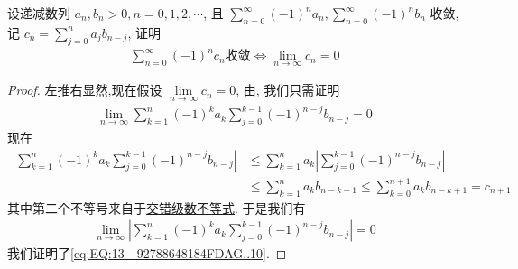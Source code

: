 \documentclass[../../main.tex]{subfiles}%
\begin{document}
\begin{example}
设递减数列 $a_n, b_n > 0, n = 0, 1, 2, \cdots$, 且 $\sum\limits_{n=0}^{\infty} (-1)^n a_n, \sum\limits_{n=0}^{\infty} (-1)^n b_n$ 收敛, 记 $c_n = \sum\limits_{j=0}^{n} a_j b_{n-j}$, 证明
\begin{align}
\sum\limits_{n=0}^{\infty} (-1)^n c_n \text{收敛} \iff \lim\limits_{n\to\infty} c_n = 0
\label{eq:EQ:13---92788648184FDAG..10}
\end{align}
\end{example}
\begin{proof}

左推右显然,现在假设 $\lim\limits_{n\to\infty} c_n = 0$, 由, 我们只需证明
\begin{align*}
\lim\limits_{n\to\infty} \sum\limits_{k=1}^{n} (-1)^k a_k \sum\limits_{j=0}^{k-1} (-1)^{n-j} b_{n-j} = 0
\end{align*}
现在
\begin{align*}
\left| \sum\limits_{k=1}^{n} (-1)^k a_k \sum\limits_{j=0}^{k-1} (-1)^{n-j} b_{n-j} \right| &\leqslant \sum\limits_{k=1}^{n} a_k \left| \sum\limits_{j=0}^{k-1} (-1)^{n-j} b_{n-j} \right| \\
&\leqslant \sum\limits_{k=1}^{n} a_k b_{n - k + 1} \leqslant \sum\limits_{k=0}^{n+1} a_k b_{n - k + 1} = c_{n+1}
\end{align*}
其中第二个不等号来自于\hyperref[theorem:交错级数不等式]{交错级数不等式}. 于是我们有
\begin{align*}
\lim\limits_{n\to\infty} \left| \sum\limits_{k=1}^{n} (-1)^k a_k \sum\limits_{j=0}^{k-1} (-1)^{n-j} b_{n-j} \right| = 0
\end{align*}
我们证明了\eqref{eq:EQ:13---92788648184FDAG..10}.

\end{proof}
\end{document}
